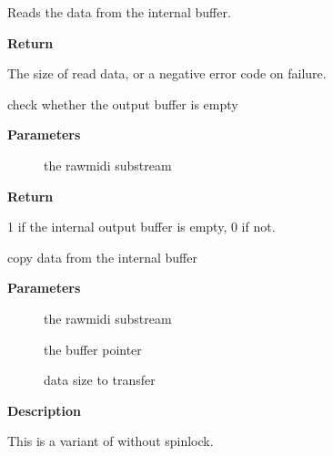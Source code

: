 \documentclass[a4paper,8pt,english]{sphinxmanual}
\begin{document}
Reads the data from the internal buffer.

\textbf{Return}

The size of read data, or a negative error code on failure.

\begin{fulllineitems}
\label{sound/kernel-api/alsa-driver-api:c.snd_rawmidi_transmit_empty}
check whether the output buffer is empty

\end{fulllineitems}


\textbf{Parameters}
\begin{description}
\item[{}] \leavevmode
the rawmidi substream

\end{description}

\textbf{Return}

1 if the internal output buffer is empty, 0 if not.

\begin{fulllineitems}
\label{sound/kernel-api/alsa-driver-api:c.__snd_rawmidi_transmit_peek}
copy data from the internal buffer

\end{fulllineitems}


\textbf{Parameters}
\begin{description}
\item[{}] \leavevmode
the rawmidi substream

\item[{}] \leavevmode
the buffer pointer

\item[{}] \leavevmode
data size to transfer

\end{description}

\textbf{Description}

This is a variant of  without spinlock.
\end{document}
